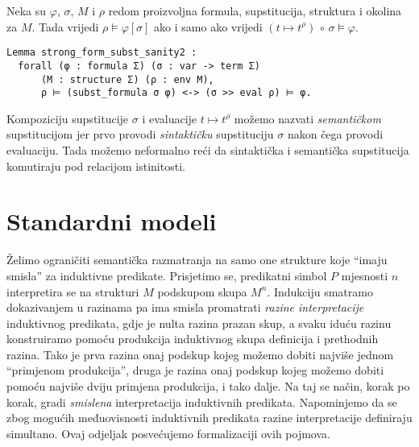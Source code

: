 \begin{lemma}
  Neka su \(\varphi\), \(\sigma\), \(M\) i \(\rho\) redom
  proizvoljna formula, supstitucija, struktura i okolina za \(M\).
  Tada vrijedi \(\rho \vDash \varphi[\sigma]\) ako i samo ako vrijedi \( (t \mapsto t^{\rho}) \, \circ \, \sigma \vDash \varphi\).
\begin{verbatim}
Lemma strong_form_subst_sanity2 :
  forall (φ : formula Σ) (σ : var -> term Σ)
      (M : structure Σ) (ρ : env M),
      ρ ⊨ (subst_formula σ φ) <-> (σ >> eval ρ) ⊨ φ.
\end{verbatim}
  \noindent Kompoziciju supstitucije \(\sigma\) i evaluacije \(t \mapsto t^{\rho}\)
  možemo nazvati \textit{semantičkom} supstitucijom
  jer prvo provodi \textit{sintaktičku} supstituciju \(\sigma\) nakon čega provodi evaluaciju.
  Tada možemo neformalno reći da sintaktička i semantička supstitucija
  komutiraju pod relacijom istinitosti.
\end{lemma}

\section{Standardni modeli}\label{sec:standardni-modeli}
Želimo ograničiti semantička razmatranja na samo one strukture koje \enquote{imaju smisla} za induktivne predikate.
Prisjetimo se, predikatni simbol \(P\) mjesnosti \(n\) interpretira se na strukturi \(M\)  podskupom skupa \(M^{n}\).
Indukciju smatramo dokazivanjem \textup{u razinama} pa ima smisla promatrati \textit{razine interpretacije} induktivnog predikata,
gdje je nulta razina prazan skup,
a svaku iduću razinu konstruiramo pomoću produkcija induktivnog skupa definicija i prethodnih razina.
Tako je prva razina onaj podskup kojeg možemo dobiti najviše jednom \enquote{primjenom produkcija},
druga je razina onaj podskup kojeg možemo dobiti pomoću najviše dviju primjena produkcija, i tako dalje.
Na taj se način, korak po korak, gradi \textit{smislena} interpretacija induktivnih predikata.
Napominjemo da se zbog mogućih međuovisnosti induktivnih predikata razine interpretacije definiraju simultano.
Ovaj odjeljak posvećujemo formalizaciji ovih pojmova.

